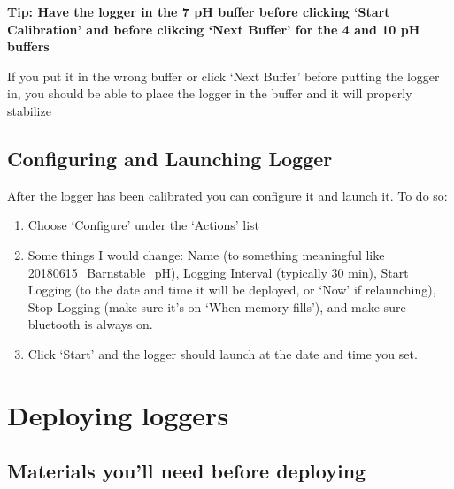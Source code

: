 \documentclass[
  letterpaper,
  DIV=11,
  numbers=noendperiod]{scrreprt}
\begin{document}
\textbf{Tip: Have the logger in the 7 pH buffer before clicking `Start
Calibration' and before clikcing `Next Buffer' for the 4 and 10 pH
buffers}

If you put it in the wrong buffer or click `Next Buffer' before putting
the logger in, you should be able to place the logger in the buffer and
it will properly stabilize

\hypertarget{configuring-and-launching-logger}{%
\subsection*{\texorpdfstring{\textbf{Configuring and Launching
Logger}}{Configuring and Launching Logger}}\label{configuring-and-launching-logger}}

After the logger has been calibrated you can configure it and launch it.
To do so:

\begin{enumerate}
\def\labelenumi{\arabic{enumi}.}
\item
  Choose `Configure' under the `Actions' list
\item
  Some things I would change: Name (to something meaningful like
  20180615\_Barnstable\_pH), Logging Interval (typically 30 min), Start
  Logging (to the date and time it will be deployed, or `Now' if
  relaunching), Stop Logging (make sure it's on `When memory fills'),
  and make sure bluetooth is always on.
\item
  Click `Start' and the logger should launch at the date and time you
  set.
\end{enumerate}

\hypertarget{deploying-loggers-1}{%
\section*{\texorpdfstring{\textbf{Deploying
loggers}}{Deploying loggers}}\label{deploying-loggers-1}}


\hypertarget{materials-youll-need-before-deploying-1}{%
\subsection*{\texorpdfstring{\textbf{Materials you'll need before
deploying}}{Materials you'll need before deploying}}\label{materials-youll-need-before-deploying-1}}
\end{document}
